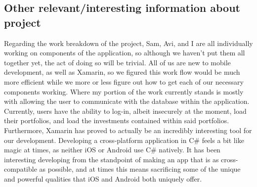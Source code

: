 \documentclass[letterpaper,10pt,titlepage,journal,compsoc,draftclsnofoot,onecolumn]{IEEEtran}
\begin{document}
\subsection{Other relevant/interesting information about project}
Regarding the work breakdown of the project, Sam, Avi, and I are all individually working on components of the application, so although we haven't put them all together yet, the act of doing so will be trivial. All of us are new to mobile development, as well as Xamarin, so we figured this work flow would be much more efficient while we more or less figure out how to get each of our necessary components working. Where my portion of the work currently stands is mostly with allowing the user to communicate with the database within the application. Currently, users have the ability to log-in, albeit insecurely at the moment, load their portfolios, and load the investments contained within said portfolios. Furthermore, Xamarin has proved to actually be an incredibly interesting tool for our development. Developing a cross-platform application in C\# feels a bit like magic at times, as neither iOS or Android use C\# natively. It has been interesting developing from the standpoint of making an app that is as cross-compatible as possible, and at times this means sacrificing some of the unique and powerful qualities that iOS and Android both uniquely offer. 
\end{document}
